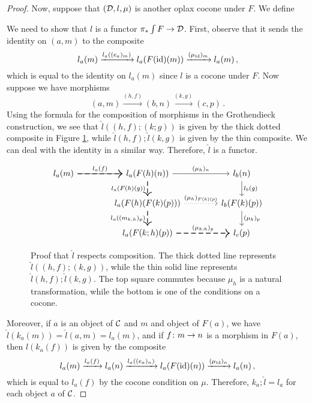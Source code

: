 \begin{proof}
  Now, suppose that $({\mathcal{D}},l,\mu)$ is another oplax cocone under $F$.  
  We define
  We need to show that $\hat{l}$ is a functor $\pi_*\int F \to {\mathcal{D}}$.
  First, observe that it sends the identity on $(a,m)$ to the composite
  \[
    l_a(m) \xrightarrow{l_a((e_a)_m)}
    l_a(F(\operatorname{id})(m)) \xrightarrow{(\mu_{\operatorname{id}})_m}
    l_a(m)\,,
    \]
  which is equal to the identity on $l_a(m)$ since $l$ is a cocone under $F$.
  Now suppose we have morphisms
  \[
    (a,m) \xrightarrow{(h,f)}
    (b,n) \xrightarrow{(k,g)}
    (c,p)\,.
    \]
  Using the formula for the composition of morphisms in the Grothendieck construction, we see that $\hat{l}((h,f);(k;g))$ is given by the thick dotted composite in Figure \ref{FigLHatFunctor}, while $\hat{l}(h,f);\hat{l}(k,g)$ is given by the thin composite.  
  We can deal with the identity in a similar way.
  Therefore, $\hat{l}$ is a functor.  
  \begin{figure}
    \[
      \begin{tikzcd}[column sep=40pt]
        l_a(m) \arrow[r, "l_a(f)"] \arrow[r, thick, dashed]
          & l_a(F(h)(n)) \arrow[r, "(\mu_h)_n"] \arrow[d, "l_a(F(h)(g))"', thick, dashed]
            & l_b(n) \arrow[d, "l_b(g)"] \\
          & l_a(F(h)(F(k)(p))) \arrow[r, "(\mu_h)_{F(k)(p)}", dotted] \arrow[d, "l_a((m_{k,h})_p)"', thick, dashed]
            & l_b(F(k)(p)) \arrow[d, "(\mu_k)_p"] \\
          & l_a(F(k;h)(p)) \arrow[r, "(\mu_{k;h})_p", thick, dashed]
            & l_c(p)
      \end{tikzcd}
      \]
    \caption[Proof that $\hat{l}$ respects composition.]
    {Proof that $\hat{l}$ respects composition.  
    The thick dotted line represents $\hat{l}((h,f);(k,g))$, while the thin solid line represents $\hat{l}(h,f);\hat{l}(k,g)$.  
    The top square commutes because $\mu_h$ is a natural transformation, while the bottom is one of the conditions on a cocone.}
    \label{FigLHatFunctor}
  \end{figure}

  Moreover, if $a$ is an object of ${\mathcal{C}}$ and $m$ and object of $F(a)$, we have $\hat{l}(k_a(m))=\hat{l}(a,m)=l_a(m)$, and if $f\colon m \to n$ is a morphism in $F(a)$, then $\hat{l}(k_a(f))$ is given by the composite
  \[
    l_a(m) \xrightarrow{l_a(f)}
    l_a(n) \xrightarrow{l_a((e_a)_n)}
    l_a(F(\operatorname{id})(n)) \xrightarrow{(\mu_{\operatorname{id}})_n}
    l_a(n)\,,
    \]
  which is equal to $l_a(f)$ by the cocone condition on $\mu$.
  Therefore, $k_a;\hat{l}=l_a$ for each object $a$ of ${\mathcal{C}}$.


\end{proof}
